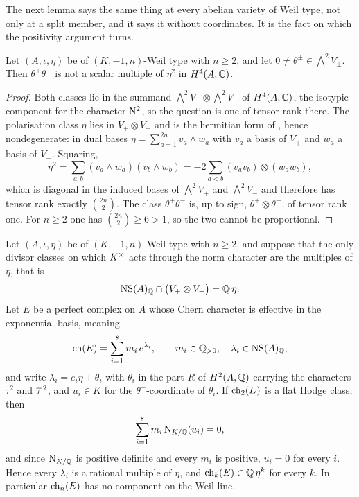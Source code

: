 The next lemma says the same thing at every abelian variety of Weil type, not
only at a split member, and it says it without coordinates. It is the fact on
which the positivity argument turns.

\begin{lemma}
\label{lem:tensorrank}
Let $(A,\iota,\eta)$ be of $(K,-1,n)$-Weil type with $n\ge2$, and let
$0\ne\theta^{\pm}\in\bigwedge^{2}V_{\pm}$. Then $\theta^{+}\theta^{-}$ is not a
scalar multiple of $\eta^{2}$ in $H^{4}(A,\mathbb{C})$.
\end{lemma}

\begin{proof}
Both classes lie in the summand
$\bigwedge^{2}V_{+}\otimes\bigwedge^{2}V_{-}$ of $H^{4}(A,\mathbb{C})$, the isotypic
component for the character $\mathrm{N}^{2}$, so the question is one of tensor rank
there. The polarisation class $\eta$ lies in $V_{+}\otimes V_{-}$ and is the
hermitian form of , hence nondegenerate: in dual bases
$\eta=\sum_{a=1}^{2n}v_{a}\wedge w_{a}$ with $v_{a}$ a basis of $V_{+}$ and
$w_{a}$ a basis of $V_{-}$. Squaring,
\[
  \eta^{2}
  =\sum_{a,b}(v_{a}\wedge w_{a})(v_{b}\wedge w_{b})
  =-2\sum_{a<b}(v_{a}v_{b})\otimes(w_{a}w_{b}),
\]
which is diagonal in the induced bases of $\bigwedge^{2}V_{+}$ and
$\bigwedge^{2}V_{-}$ and therefore has tensor rank exactly $\binom{2n}{2}$.
The class $\theta^{+}\theta^{-}$ is, up to sign,
$\theta^{+}\otimes\theta^{-}$, of tensor rank one. For $n\ge2$ one has
$\binom{2n}{2}\ge6>1$, so the two cannot be proportional.
\end{proof}

\begin{theorem}\label{thm:positivity}
Let $(A,\iota,\eta)$ be of $(K,-1,n)$-Weil type with $n\ge2$, and suppose that
the only divisor classes on which $K^{\times}$ acts through the norm character are
the multiples of $\eta$, that is
\begin{equation}\label{eq:noextranorm}
  \mathrm{NS}(A)_{\mathbb{Q}}\cap\bigl(V_{+}\otimes V_{-}\bigr)=\mathbb{Q}\,\eta .
\end{equation}
Let $E$ be a perfect complex on $A$ whose Chern character is effective in the
exponential basis, meaning
\begin{equation}\label{eq:effectivech}
  \operatorname{ch}(E)=\sum_{i=1}^{s}m_{i}\,e^{\lambda_{i}},
  \qquad m_{i}\in\mathbb{Q}_{>0},\quad\lambda_{i}\in\mathrm{NS}(A)_{\mathbb{Q}},
\end{equation}
and write $\lambda_{i}=e_{i}\eta+\theta_{i}$ with $\theta_{i}$ in the part $R$
of $H^{2}(A,\mathbb{Q})$ carrying the characters $\tau^{2}$ and $\overline{\tau}^{\,2}$, and
$u_{i}\in K$ for the $\theta^{+}$-coordinate of $\theta_{i}$. If $\operatorname{ch}_{2}(E)$
is a flat Hodge class, then
\begin{equation}\label{eq:normsum}
  \sum_{i=1}^{s}m_{i}\,\mathrm{N}_{K/\mathbb{Q}}(u_{i})=0 ,
\end{equation}
and since $\mathrm{N}_{K/\mathbb{Q}}$ is positive definite and every $m_{i}$ is positive,
$u_{i}=0$ for every $i$. Hence every $\lambda_{i}$ is a rational multiple of
$\eta$, and $\operatorname{ch}_{k}(E)\in\mathbb{Q}\,\eta^{k}$ for every $k$. In particular
$\operatorname{ch}_{n}(E)$ has no component on the Weil line.
\end{theorem}

